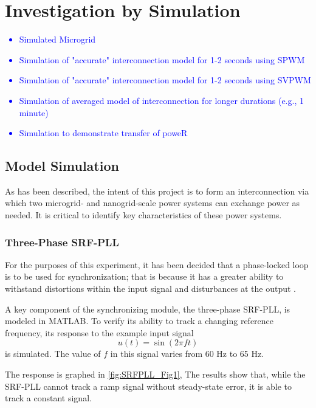 \chapter{Investigation by Simulation}

\textcolor{blue}{
\begin{itemize}
    \item Simulated Microgrid
    \item Simulation of "accurate" interconnection model for 1-2 seconds using SPWM
    \item Simulation of "accurate" interconnection model for 1-2 seconds using SVPWM
    \item Simulation of averaged model of interconnection for longer durations (e.g., 1 minute)
    \item Simulation to demonstrate transfer of poweR 
\end{itemize}
}

\section{Model Simulation}

As has been described, the intent of this project is to form an interconnection via which two microgrid- and nanogrid-scale power systems can exchange power as needed. It is critical to identify key characteristics of these power systems.

\subsection{Three-Phase SRF-PLL}

For the purposes of this experiment, it has been decided that a phase-locked loop is to be used for synchronization; that is because it has a greater ability to withstand distortions within the input signal and disturbances at the output \cite{Guerrero_Vasquez_3PLL}.

A key component of the synchronizing module, the three-phase SRF-PLL, is modeled in \textsc{MATLAB}. To verify its ability to track a changing reference frequency, its response to the example input signal 
\begin{equation}
    u(t) = \sin(2{\pi}ft)
\end{equation}
is simulated. The value of $f$ in this signal varies from 60 Hz to 65 Hz.
\begin{comment}
\begin{figure}
    \centering
    \texttt{[image: Images/Sine\_variation\_Graph\_Real.eps]}
    \caption{The response of the simulated SRF-PLL}
    \label{fig:SRFPLL_Fig1}
\end{figure}
\end{comment}
The response is graphed in \autoref{fig:SRFPLL_Fig1}, The results show that, while the SRF-PLL cannot track a ramp signal without steady-state error, it is able to track a constant signal.


